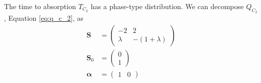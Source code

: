 \documentclass{article}
\theoremstyle{plain}
\theoremstyle{definition}
\theoremstyle{remark}
\numberwithin{equation}{section}
\begin{document}
The time to absorption $T_{C_2}$ has a phase-type distribution.
We can decompose $Q_{C_2}$, Equation \eqref{eq:q_c_2}, as
\begin{align*}
    \mathbf{S} &= \begin{pmatrix}
        -2 & 2\\
        \lambda & - (1 + \lambda)
    \end{pmatrix}\\
    \mathbf{S}_0 &= \begin{pmatrix}
        0\\
        1
    \end{pmatrix}\\
    \boldsymbol{\alpha} &= \begin{pmatrix}
    1 & 0
    \end{pmatrix}
\end{align*}
\end{document}
